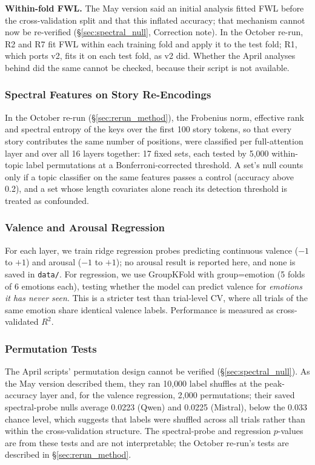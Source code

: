 \documentclass[11pt,a4paper]{article}
\begin{document}
\textbf{Within-fold FWL.} The May version said an initial analysis fitted FWL before the cross-validation split and that this inflated accuracy; that mechanism cannot now be re-verified (\S\ref{sec:spectral_null}, Correction note). In the October re-run, R2 and R7 fit FWL within each training fold and apply it to the test fold; R1, which ports v2, fits it on each test fold, as v2 did. Whether the April analyses behind  did the same cannot be checked, because their script is not available.

\subsubsection{Spectral Features on Story Re-Encodings}

In the October re-run (\S\ref{sec:rerun_method}), the Frobenius norm, effective rank and spectral entropy of the keys over the first 100 story tokens, so that every story contributes the same number of positions, were classified per full-attention layer and over all 16 layers together: 17 fixed sets, each tested by 5{,}000 within-topic label permutations at a Bonferroni-corrected threshold. A set's null counts only if a topic classifier on the same features passes a control (accuracy above 0.2), and a set whose length covariates alone reach its detection threshold is treated as confounded.

\subsubsection{Valence and Arousal Regression}

For each layer, we train ridge regression probes predicting continuous valence ($-1$ to $+1$) and arousal ($-1$ to $+1$); no arousal result is reported here, and none is saved in \texttt{data/}. For regression, we use GroupKFold with group=emotion (5 folds of 6 emotions each), testing whether the model can predict valence for \emph{emotions it has never seen}. This is a stricter test than trial-level CV, where all trials of the same emotion share identical valence labels. Performance is measured as cross-validated $R^2$.

\subsubsection{Permutation Tests}

The April scripts' permutation design cannot be verified (\S\ref{sec:spectral_null}). As the May version described them, they ran 10{,}000 label shuffles at the peak-accuracy layer and, for the valence regression, 2{,}000 permutations; their saved spectral-probe nulls average 0.0223 (Qwen) and 0.0225 (Mistral), below the 0.033 chance level, which suggests that labels were shuffled across all trials rather than within the cross-validation structure. The spectral-probe and regression $p$-values are from these tests and are not interpretable; the October re-run's tests are described in \S\ref{sec:rerun_method}.
\end{document}
